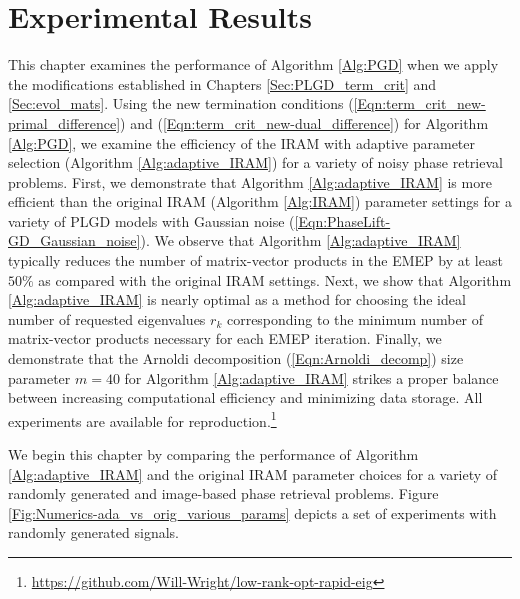 \chapter{Experimental Results}
\label{Sec:Numerics}


This chapter examines the performance of Algorithm \ref{Alg:PGD} when we apply the modifications established in Chapters \ref{Sec:PLGD_term_crit} and \ref{Sec:evol_mats}.
Using the new termination conditions (\ref{Eqn:term_crit_new-primal_difference}) and (\ref{Eqn:term_crit_new-dual_difference}) for Algorithm \ref{Alg:PGD}, we examine the efficiency of the IRAM with adaptive parameter selection (Algorithm \ref{Alg:adaptive_IRAM}) for a variety of noisy phase retrieval problems.
First, we demonstrate that Algorithm \ref{Alg:adaptive_IRAM} is more efficient than the original IRAM (Algorithm \ref{Alg:IRAM}) parameter settings for a variety of PLGD models with Gaussian noise (\ref{Eqn:PhaseLift-GD_Gaussian_noise}).
We observe that Algorithm \ref{Alg:adaptive_IRAM} typically reduces the number of matrix-vector products in the EMEP by at least $50\%$ as compared with the original IRAM settings.
Next, we show that Algorithm \ref{Alg:adaptive_IRAM} is nearly optimal as a method for choosing the ideal number of requested eigenvalues $r_k$ corresponding to the minimum number of matrix-vector products necessary for each EMEP iteration.
Finally, we demonstrate that the Arnoldi decomposition (\ref{Eqn:Arnoldi_decomp}) size parameter $m = 40$ for Algorithm \ref{Alg:adaptive_IRAM} strikes a proper balance between increasing computational efficiency and minimizing data storage.
All experiments are available for reproduction.\footnote{\url{https://github.com/Will-Wright/low-rank-opt-rapid-eig}}




We begin this chapter by comparing the performance of Algorithm \ref{Alg:adaptive_IRAM} and the original IRAM parameter choices for a variety of randomly generated and image-based phase retrieval problems.
Figure \ref{Fig:Numerics-ada_vs_orig_various_params} depicts a set of experiments with randomly generated signals.


